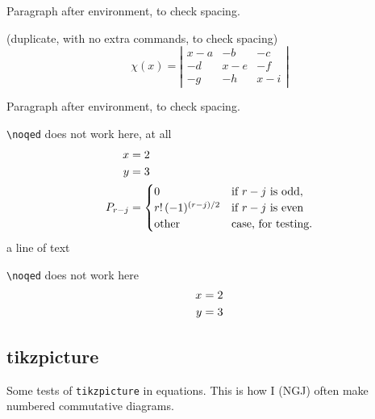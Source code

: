 Paragraph after environment, to check spacing.

\begin{test} (duplicate, with no extra commands, to check spacing)
  \begin{equation*}
    \chi(x) =
    \left|              %
      \begin{array}{ccc}
        x-a  &-b  &-c  \\
        -d   &x-e &-f  \\
        -g   &-h  &x-i
      \end{array}
    \right|
  \end{equation*}
\end{test}

Paragraph after environment, to check spacing.


\begin{test}
  \verb|\noqed| does not work here, at all
  \begin{align}
    x & = 2\\
    y & = 3\\
    P_{r-j} & =
    \begin{cases}
      0& \text{if $r-j$ is odd},\\
      r!\,(-1)^{(r-j)/2}& \text{if $r-j$ is even}\\
      \text{other} & \text{case, for testing.}\noqed
    \end{cases} \noqed
  \end{align}\noqed
  a line of text \noqed 
\end{test}

\begin{test}
  \verb|\noqed| does not work here
  \begin{align}
    x & = 2\\
    y & = 3\noqed
  \end{align}
\end{test}

\subsection{tikzpicture}

Some tests of \texttt{tikzpicture} in equations.
This is how I (NGJ) often make numbered commutative diagrams.


